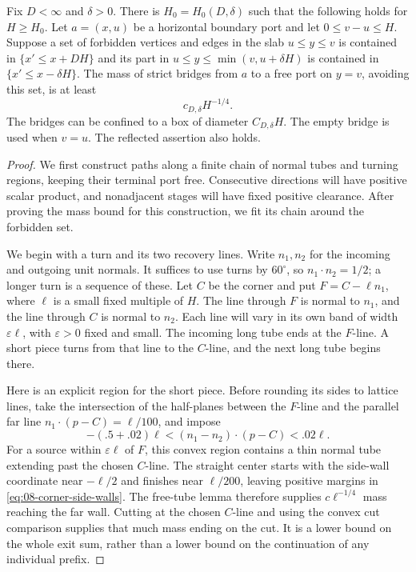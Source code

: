 \begin{lemma}\label{lem:08-sharp-corridor}
Fix $D<\infty$ and $\delta>0$. There is $H_0=H_0(D,\delta)$ such that the following holds for $H\ge H_0$. Let $a=(x,u)$ be a horizontal boundary port and let
$0\le v-u\le H$. Suppose a set of forbidden vertices and edges in the
slab $u\le y\le v$ is contained in $\{x'\le x+DH\}$ and its part in
$u\le y\le\min(v,u+\delta H)$ is contained in
$\{x'\le x-\delta H\}$. The mass of strict bridges from $a$ to a free
port on $y=v$, avoiding this set, is at least
\[
 c_{D,\delta}H^{-1/4}.
\]
The bridges can be confined to a box of diameter $C_{D,\delta}H$.
The empty bridge is used when $v=u$. The reflected assertion also holds.

\end{lemma}
\begin{proof}
We first construct paths along a finite chain of normal tubes and
turning regions, keeping their terminal port free. Consecutive directions
will have positive scalar product, and nonadjacent stages will have
fixed positive clearance. After proving the mass bound for this
construction, we fit its chain around the forbidden set.

We begin with a turn and its two recovery lines. Write $n_1,n_2$ for
the incoming and outgoing unit normals. It suffices to use turns by
$60^\circ$, so $n_1\cdot n_2=1/2$; a longer turn is a sequence of these.
Let $C$ be the corner and put $F=C-\ell n_1$, where $\ell$ is a small
fixed multiple of $H$. The line through $F$ is normal to $n_1$, and the
line through $C$ is normal to $n_2$. Each line will vary in its own band
of width $\varepsilon\ell$, with $\varepsilon>0$ fixed and small.
The incoming long tube ends at the $F$-line. A short piece turns from
that line to the $C$-line, and the next long tube begins there.

Here is an explicit region for the short piece. Before rounding its
sides to lattice lines, take the intersection of the half-planes between
the $F$-line and the parallel far line
$n_1\cdot(p-C)=\ell/100$, and impose
\begin{equation}\label{eq:08-corner-side-walls}
 -(.5+.02)\ell<(n_1-n_2)\cdot(p-C)<.02\ell.
\end{equation}
For a source within $\varepsilon\ell$ of $F$, this convex region
contains a thin normal tube extending past the chosen $C$-line.
The straight center starts with the side-wall coordinate near
$-\ell/2$ and finishes near $\ell/200$, leaving positive margins in
\eqref{eq:08-corner-side-walls}. The free-tube lemma therefore supplies
$c\ell^{-1/4}$ mass reaching the far wall. Cutting at the chosen
$C$-line and using the convex cut comparison supplies that much mass
ending on the cut. It is a lower bound on the whole exit sum, rather
than a lower bound on the continuation of any individual prefix.


\end{proof}
